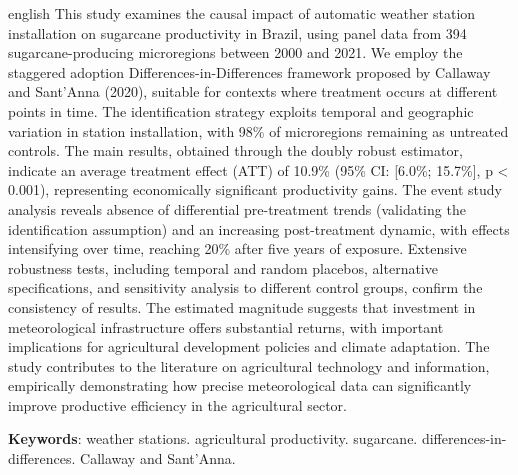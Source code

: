 \documentclass[
	12pt,				%
	openright,			%
	oneside,			%
	a4paper,			%
	english,			%
	french,				%
	spanish,			%
	brazil				%
	]{abntex2}
\begin{document}
\begin{resumo}[Abstract]
 \begin{otherlanguage*}{english}
This study examines the causal impact of automatic weather station installation on sugarcane productivity in Brazil, using panel data from 394 sugarcane-producing microregions between 2000 and 2021. We employ the staggered adoption Differences-in-Differences framework proposed by Callaway and Sant'Anna (2020), suitable for contexts where treatment occurs at different points in time. The identification strategy exploits temporal and geographic variation in station installation, with 98\% of microregions remaining as untreated controls. The main results, obtained through the doubly robust estimator, indicate an average treatment effect (ATT) of 10.9\% (95\% CI: [6.0\%; 15.7\%], p < 0.001), representing economically significant productivity gains. The event study analysis reveals absence of differential pre-treatment trends (validating the identification assumption) and an increasing post-treatment dynamic, with effects intensifying over time, reaching 20\% after five years of exposure. Extensive robustness tests, including temporal and random placebos, alternative specifications, and sensitivity analysis to different control groups, confirm the consistency of results. The estimated magnitude suggests that investment in meteorological infrastructure offers substantial returns, with important implications for agricultural development policies and climate adaptation. The study contributes to the literature on agricultural technology and information, empirically demonstrating how precise meteorological data can significantly improve productive efficiency in the agricultural sector.

   \textbf{Keywords}: weather stations. agricultural productivity. sugarcane. differences-in-differences. Callaway and Sant'Anna.
 \end{otherlanguage*}
\end{resumo}

\listoffigures*
\cleardoublepage

\listoftables*
\cleardoublepage

\tableofcontents*
\cleardoublepage

\textual
\end{document}
